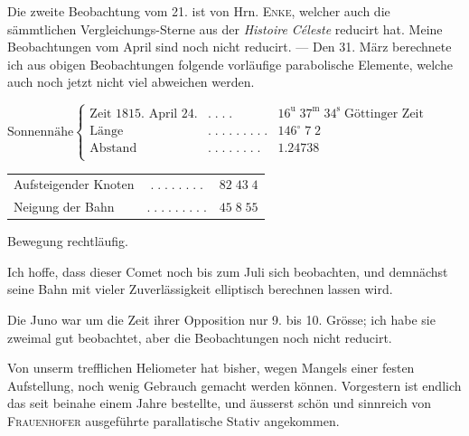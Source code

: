 \par\indent Die zweite Beobachtung vom 21. ist von Hrn. \textsc{Enke}, welcher auch die sämmtlichen Vergleichungs-Sterne
aus der \emph{Histoire Céleste} reducirt hat. Meine Beobachtungen vom April sind noch nicht reducirt. ---
Den 31. März berechnete ich aus obigen Beobachtungen folgende vorläufige parabolische Elemente,
welche auch noch jetzt nicht viel abweichen werden.

\begin{center}\fontsize{9}{11}\selectfont $\text{Sonnennähe}\left\{\begin{array}{lcr}
\text{Zeit 1815. April 24.} & .\;.\;.\;. & 16^{\mathrm u}\;37^{\mathrm m}\;34^{\mathrm s}\;\text{Göttinger Zeit}\\
\text{Länge} & .\;.\;.\;.\;.\;.\;.\;.\;. & 146^\circ\;7\;2\\
\text{Abstand} & .\;.\;.\;.\;.\;.\;.\;. & 1.24738\\
\end{array}\right.$\end{center}
\begin{center}\fontsize{10}{12}\selectfont\setlength{\tabcolsep}{3pt}\renewcommand{\arraystretch}{1.15}\begin{tabular}{lcr}
Aufsteigender Knoten & $.\;.\;.\;.\;.\;.\;.\;.$ & $82\;43\;4$\\
Neigung der Bahn & $.\;.\;.\;.\;.\;.\;.\;.\;.$ & $45\;8\;55$\\
\end{tabular}\end{center}
\noindent Bewegung rechtläufig.

\par\indent Ich hoffe, dass dieser Comet noch bis zum Juli sich beobachten, und demnächst seine Bahn mit
vieler Zuverlässigkeit elliptisch berechnen lassen wird.

\par\indent Die Juno war um die Zeit ihrer Opposition nur 9. bis 10. Grösse; ich habe sie zweimal gut
beobachtet, aber die Beobachtungen noch nicht reducirt.

\par\indent Von unserm trefflichen Heliometer hat bisher, wegen Mangels einer festen Aufstellung, noch
wenig Gebrauch gemacht werden können. Vorgestern ist endlich das seit beinahe einem Jahre
bestellte, und äusserst schön und sinnreich von \textsc{Frauenhofer} ausgeführte parallatische Stativ
angekommen.
